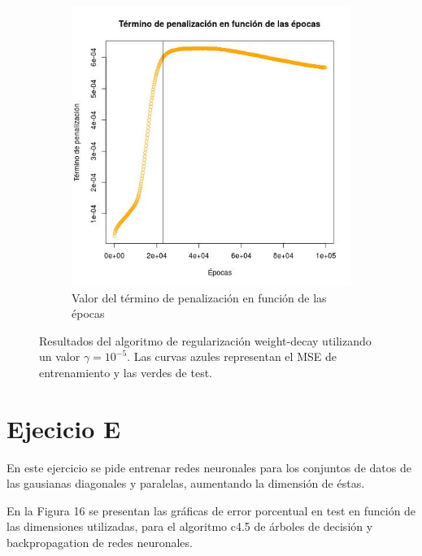 \documentclass[12pt, a4paper]{article}
\begin{document}
\begin{figure}
\begin{subfigure}[b]{0.45\textwidth}
        \includegraphics[width=\textwidth]{penalizacion4}
        \caption{Valor del término de penalización en función de las épocas}
    \end{subfigure}
    \caption{Resultados del algoritmo de regularización weight-decay utilizando un valor $\gamma = 10^{-5}$. Las curvas azules representan el MSE de entrenamiento y las verdes de test.}
\end{figure}



\section*{Ejecicio E}
En este ejercicio se pide entrenar redes neuronales para los conjuntos de datos de las gausianas diagonales y paralelas, aumentando la dimensión de éstas. 

\bigskip

En la Figura 16 se presentan las gráficas de error porcentual en test en función de las dimensiones utilizadas, para el algoritmo c4.5 de árboles de decisión y backpropagation de redes neuronales.
\end{document}
